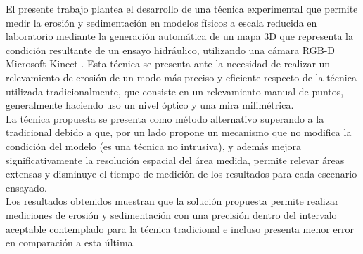 \begin{resumen}
El presente trabajo plantea el desarrollo de una técnica experimental que permite medir la erosión y sedimentación en modelos físicos a escala reducida en laboratorio mediante la generación automática de un mapa 3D que representa la condición resultante de un ensayo hidráulico, utilizando una cámara RGB-D Microsoft Kinect \cite{microsoft-kinect}. Esta técnica se presenta ante la necesidad de realizar un relevamiento de erosión de un modo más preciso y eficiente respecto de la técnica utilizada tradicionalmente, que consiste en un relevamiento manual de puntos, generalmente haciendo uso un nivel óptico y una mira milimétrica. \\
La técnica propuesta se presenta como método alternativo superando a la tradicional debido a que, por un lado propone un mecanismo que no modifica la condición del modelo (es una técnica no intrusiva), y además mejora significativamente la resolución espacial del área medida, permite relevar áreas extensas y disminuye el tiempo de medición de los resultados para cada escenario ensayado. \\
Los resultados obtenidos muestran que la solución propuesta permite realizar mediciones de erosión y sedimentación con una precisión dentro del intervalo aceptable contemplado para la técnica tradicional e incluso presenta menor error en comparación a esta última.
\end{resumen}


